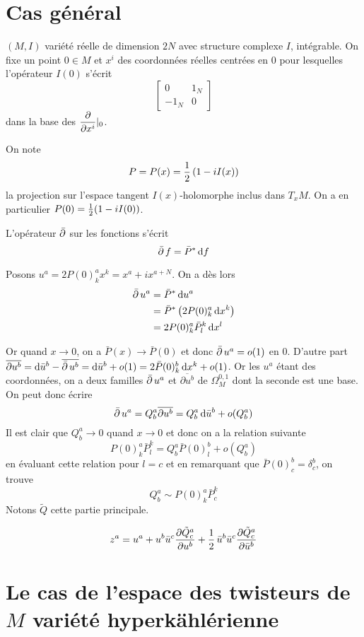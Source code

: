 \section{Cas général}
$(M,I)$ variété réelle de dimension $2N$ avec structure complexe $I$, intégrable. On fixe un point $0 \in M$ et $x^i$ des coordonnées réelles centrées en $0$ pour lesquelles l'opérateur $I(0)$ s'écrit
\[
\begin{bmatrix}
0 & 1_N \\ 
-1_N & 0
\end{bmatrix} 
\]
dans la base des $\dfrac{\partial{}}{\partial{x^i}}\vert_{ 0}$.


On note
\begin{equation}
P = P(x) =  \operatorname{\frac{1}{2}} \left( 1 - iI(x)\right)
\end{equation}
la projection sur l'espace tangent $I(x)$-holomorphe inclus dans $T_xM$. On a en particulier $P(0) = \operatorname{\frac{1}{2}} (1- iI(0))$.


L'opérateur $\operatorname{\bar{\partial}}$ sur les fonctions s'écrit
\begin{equation}
\operatorname{\bar{\partial}} f = \bar{P}^* \operatorname{d\!} f
\end{equation}

Posons $u^a = 2 P(0)^a_k x^k = x^a + ix^{a+N}$. On a dès lors
\begin{align*}
\operatorname{\bar{\partial}} u^a & = \bar{P}^* \operatorname{d\!} u^a\\
					 & = \bar{P}^* \left( 2P(0)^a_k \operatorname{d\!} x^k\right)\\
					 & = 2P(0)^a_k \bar{P}^k_l \operatorname{d\!} x^l
\end{align*}

Or quand $x \rightarrow 0$, on a $\bar{P}(x) \rightarrow \bar{P}(0)$ et donc $\operatorname{\bar{\partial}} u^a = o(1)$ en $0$. D'autre part $\overline{\partial u^b} = \operatorname{d\!} \bar{u}^b - \overline{\operatorname{\bar{\partial}} u^b} = \operatorname{d\!} \bar{u}^b + o(1) = 2\bar{P}(0)^b_k \operatorname{d\!} x^k + o(1)$. Or les $u^a$ étant des coordonnées, on a deux familles $\operatorname{\bar{\partial}} u^a$ et $\overline{\partial u^b}$ de $\Omega^{0,1}_M$ dont la seconde est une base. On peut donc écrire
\[
\operatorname{\bar{\partial}} u^a = Q^a_b \overline{\partial u^b} = Q^a_b\operatorname{d\!} \bar{u}^b + o(Q^a_b)
\]
Il est clair que $Q^a_b \rightarrow 0$ quand $x \rightarrow 0$ et donc on a la relation suivante
\[
P(0)^a_k \bar{P}^k_l = Q^a_b \bar{P}(0)^b_l + o(Q^a_b)
\]
en évaluant cette relation pour $l = c$ et en remarquant que $\bar{P}(0)^b_c = \delta^b_c$, on trouve
\[
Q^a_b \sim P(0)^a_k \bar{P}^k_c
\]
Notons $\tilde{Q}$ cette partie principale.

\todo {\bf [\dots]}

\begin{equation}
z^a = u^a + u^b\bar{u}^c\dfrac{\partial{\tilde{Q}^a_c}}{\partial{u^b}}+ \operatorname{\frac{1}{2}} \bar{u}^b\bar{u}^c\dfrac{\partial{\tilde{Q}^a_c}}{\partial{\bar{u}^b}}
\end{equation}

\section{Le cas de l'espace des twisteurs de $M$ variété hyperkählérienne}
